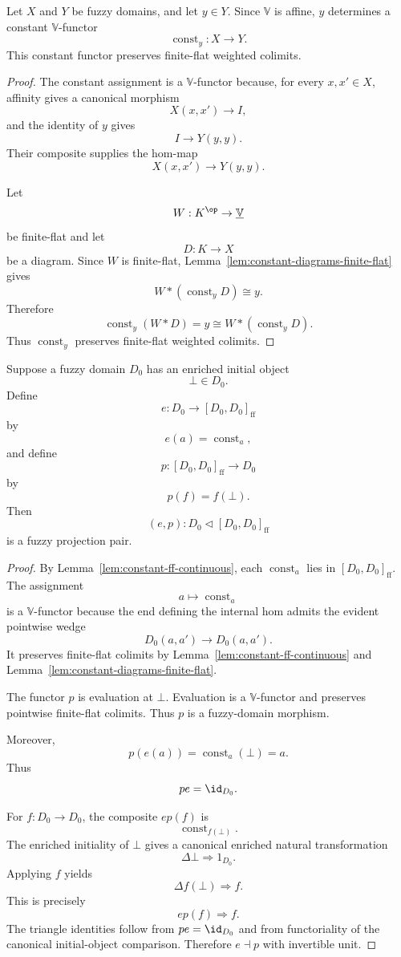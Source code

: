 \begin{lemma}
\label{lem:constant-ff-continuous}
Let \(X\) and \(Y\) be fuzzy domains, and let \(y\in Y\).  Since
\(\mathbb V\) is affine, \(y\) determines a constant \(\mathbb V\)-functor
\[
    \operatorname{const}_y:X\to Y.
\]
This constant functor preserves finite-flat weighted colimits.
\end{lemma}

\begin{proof}
The constant assignment is a \(\mathbb V\)-functor because, for every
\(x,x'\in X\), affinity gives a canonical morphism
\[
    X(x,x')\to I,
\]
and the identity of \(y\) gives
\[
    I\to Y(y,y).
\]
Their composite supplies the hom-map
\[
    X(x,x')\to Y(y,y).
\]

Let
\[
    W:K^{\op}\to\underline{\mathbb V}
\]
be finite-flat and let
\[
    D:K\to X
\]
be a diagram.  Since \(W\) is finite-flat,
Lemma~\ref{lem:constant-diagrams-finite-flat} gives
\[
    W*(\operatorname{const}_yD)
    \cong
    y.
\]
Therefore
\[
    \operatorname{const}_y(W*D)
    =
    y
    \cong
    W*(\operatorname{const}_yD).
\]
Thus \(\operatorname{const}_y\) preserves finite-flat weighted colimits.
\end{proof}

\begin{proposition}
\label{prop:pure-constant-map-seed-ff}
Suppose a fuzzy domain \(D_0\) has an enriched initial object
\[
    \bot\in D_0.
\]
Define
\[
    e:D_0\to [D_0,D_0]_{\mathrm{ff}}
\]
by
\[
    e(a)=\operatorname{const}_a,
\]
and define
\[
    p:[D_0,D_0]_{\mathrm{ff}}\to D_0
\]
by
\[
    p(f)=f(\bot).
\]
Then
\[
    (e,p):D_0\triangleleft [D_0,D_0]_{\mathrm{ff}}
\]
is a fuzzy projection pair.
\end{proposition}

\begin{proof}
By Lemma~\ref{lem:constant-ff-continuous}, each \(\operatorname{const}_a\)
lies in \([D_0,D_0]_{\mathrm{ff}}\).  The assignment
\[
    a\longmapsto\operatorname{const}_a
\]
is a \(\mathbb V\)-functor because the end defining the internal hom admits the
evident pointwise wedge
\[
    D_0(a,a')\to D_0(a,a').
\]
It preserves finite-flat colimits by Lemma~\ref{lem:constant-ff-continuous} and
Lemma~\ref{lem:constant-diagrams-finite-flat}.

The functor \(p\) is evaluation at \(\bot\).  Evaluation is a
\(\mathbb V\)-functor and preserves pointwise finite-flat colimits.  Thus \(p\)
is a fuzzy-domain morphism.

Moreover,
\[
    p(e(a))
    =
    \operatorname{const}_a(\bot)
    =
    a.
\]
Thus
\[
    pe=\id_{D_0}.
\]

For \(f:D_0\to D_0\), the composite \(ep(f)\) is
\[
    \operatorname{const}_{f(\bot)}.
\]
The enriched initiality of \(\bot\) gives a canonical enriched natural
transformation
\[
    \Delta\bot\Rightarrow 1_{D_0}.
\]
Applying \(f\) yields
\[
    \Delta f(\bot)\Rightarrow f.
\]
This is precisely
\[
    ep(f)\Rightarrow f.
\]
The triangle identities follow from \(pe=\id_{D_0}\) and from functoriality of
the canonical initial-object comparison.  Therefore \(e\dashv p\) with
invertible unit.
\end{proof}

